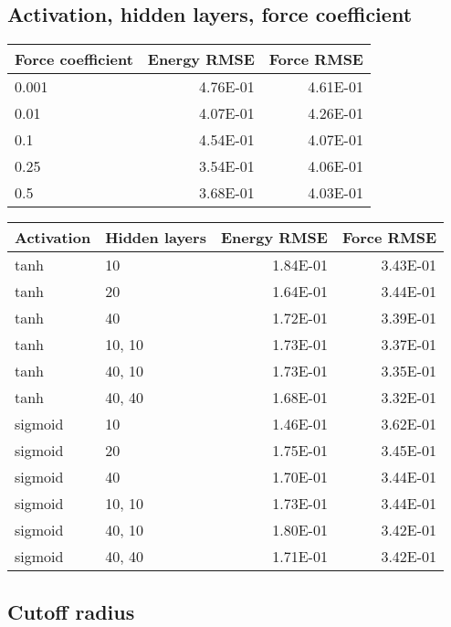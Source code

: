 \subsection{Activation, hidden layers, force coefficient}

\begin{tabular}{lrr}
\toprule
Force coefficient &  Energy RMSE &  Force RMSE \\
\midrule
        0.001 &     4.76E-01 &    4.61E-01 \\
         0.01 &     4.07E-01 &    4.26E-01 \\
          0.1 &     4.54E-01 &    4.07E-01 \\
         0.25 &     3.54E-01 &    4.06E-01 \\
          0.5 &     3.68E-01 &    4.03E-01 \\
\bottomrule
\end{tabular}

\begin{tabular}{llrr}
\toprule
Activation & Hidden layers &  Energy RMSE &  Force RMSE \\
\midrule
      tanh &          10 &     1.84E-01 &    3.43E-01 \\
      tanh &          20 &     1.64E-01 &    3.44E-01 \\
      tanh &          40 &     1.72E-01 &    3.39E-01 \\
      tanh &      10, 10 &     1.73E-01 &    3.37E-01 \\
      tanh &      40, 10 &     1.73E-01 &    3.35E-01 \\
      tanh &      40, 40 &     1.68E-01 &    3.32E-01 \\
   sigmoid &          10 &     1.46E-01 &    3.62E-01 \\
   sigmoid &          20 &     1.75E-01 &    3.45E-01 \\
   sigmoid &          40 &     1.70E-01 &    3.44E-01 \\
   sigmoid &      10, 10 &     1.73E-01 &    3.44E-01 \\
   sigmoid &      40, 10 &     1.80E-01 &    3.42E-01 \\
   sigmoid &      40, 40 &     1.71E-01 &    3.42E-01 \\
\bottomrule
\end{tabular}

\subsection{Cutoff radius}


